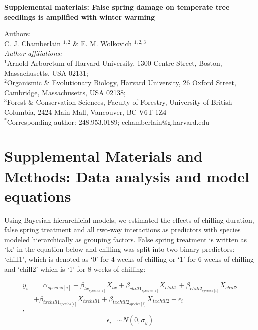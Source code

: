 \documentclass{article}\usepackage[]{graphicx}\usepackage[]{color}
\begin{document}
\noindent \textbf{\Large{Supplemental materials: False spring damage on temperate tree seedlings is amplified with winter warming}}

\noindent Authors:\\
C. J. Chamberlain $^{1,2}$ \& E. M. Wolkovich $^{1,2,3}$
\vspace{2ex}\\
\emph{Author affiliations:}\\
$^{1}$Arnold Arboretum of Harvard University, 1300 Centre Street, Boston, Massachusetts, USA 02131; \\
$^{2}$Organismic \& Evolutionary Biology, Harvard University, 26 Oxford Street, Cambridge, Massachusetts, USA 02138; \\
$^{3}$Forest \& Conservation Sciences, Faculty of Forestry, University of British Columbia, 2424 Main Mall, Vancouver, BC V6T 1Z4\\
\vspace{2ex}
$^*$Corresponding author: 248.953.0189; cchamberlain@g.harvard.edu\\

\renewcommand{\thetable}{S\arabic{table}}
\renewcommand{\thefigure}{S\arabic{figure}}
\renewcommand{\labelitemi}{$-$}



\section*{Supplemental Materials and Methods: Data analysis and model equations}
Using Bayesian hierarchicial models, we estimated the effects of chilling duration, false spring treatment and all two-way interactions as predictors with species modeled hierarchically as grouping factors. False spring treatment is written as `tx' in the equation below and chilling was split into two binary predictors: `chill1', which is denoted as `0' for 4 weeks of chilling or `1' for 6 weeks of chilling and `chill2' which is `1' for 8 weeks of chilling:

\begin{align*}
y_i &= \alpha_{species[i]} + \beta_{tx_{species[i]}}X_{tx} + \beta_{chill1_{species[i]}}X_{chill1} + \beta_{chill2_{species[i]}}X_{chill2}\\
&+ \beta_{txchill1_{species[i]}}X_{txchill1} + \beta_{txchill2_{species[i]}}X_{txchill2} + \epsilon_i \tag{1}\\,
\end{align*}
\begin{align*}
\epsilon_i & \sim N(0,\sigma_y) \\
\end{align*}
\end{document}
